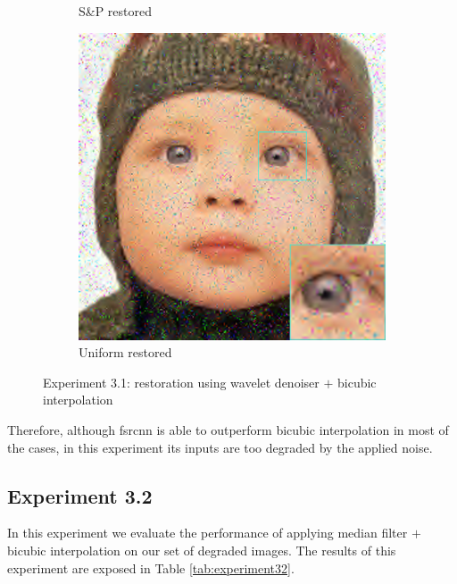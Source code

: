 \begin{figure}
\begin{subfigure}{0.24\textwidth}
		\caption{S\&P restored}
	\end{subfigure}
	\begin{subfigure}{0.24\textwidth}
		\includegraphics[width=\textwidth]{images/exp3.1/uniform.png}
		\caption{Uniform restored}
	\end{subfigure}
	\caption{Experiment 3.1: restoration using wavelet denoiser $+$ bicubic interpolation}
	\label{fig:exp3.1}
\end{figure}

Therefore, although \gls{fsrcnn} is able to outperform bicubic interpolation in most of the cases, in this experiment its inputs are too degraded by the applied noise.

\newpage\subsection{Experiment 3.2}
In this experiment we evaluate the performance of applying median filter $+$ bicubic interpolation on our set of degraded images. The results of this experiment are exposed in Table \ref{tab:experiment32}.

